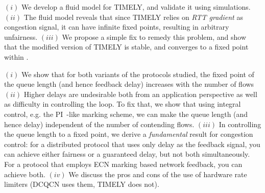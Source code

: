  $(i)$ We develop a fluid model for TIMELY, and validate it using
simulations. $(ii)$ The fluid model reveals that since TIMELY relies on {\em RTT
gradient} as congestion signal, it can have infinite fixed points, resulting in
arbitrary unfairness.  $(iii)$ We propose a simple fix to remedy this problem,
and show that the modified version of TIMELY is stable, and converges to a fixed
point within . 

 $(i)$ We show that for both variants of
the protocols studied, the fixed point of the queue length (and hence
feedback delay) increases with the number of flows $(ii)$ Higher
delays are undesirable both from an application perspective as well as
difficulty in controlling the loop. To fix that, we show that using
integral control, e.g. the PI~\cite{Hollot:PIController}-like
marking scheme, we can make 
the queue length (and hence delay) independent of the number of contending
flows. $(iii)$ In controlling the queue length to a fixed point, we
derive a \emph{fundamental} result for congestion control: for a
distributed protocol that uses only delay as the feedback signal, you
can achieve either fairness or a guaranteed delay, but not both simultaneously. For a
protocol that employs ECN marking based network feedback, you can
achieve both. $(iv)$ We discuss the pros and cons of the use of hardware rate limiters
(DCQCN uses them, TIMELY does not).

